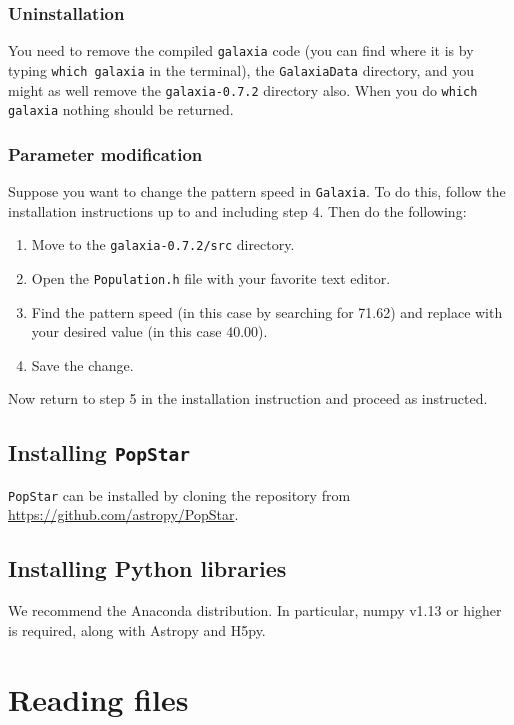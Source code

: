 \documentclass{scrartcl}
\begin{document}
\subsubsection{Uninstallation}

You need to remove the compiled \texttt{galaxia} code (you can find where it is by typing \texttt{which galaxia} in the terminal), the \texttt{GalaxiaData} directory, and you might as well remove the \texttt{galaxia-0.7.2} directory also.
When you do \texttt{which galaxia} nothing should be returned.

\subsubsection{Parameter modification}

Suppose you want to change the pattern speed in \texttt{Galaxia}.
To do this, follow the installation instructions up to and including step 4.
Then do the following:
\begin{enumerate}
    \item Move to the \texttt{galaxia-0.7.2/src} directory.
    \item Open the \texttt{Population.h} file with your favorite text editor.
    \item Find the pattern speed (in this case by searching for 71.62) and replace with your desired value (in this case 40.00).
    \item Save the change.
\end{enumerate}
Now return to step 5 in the installation instruction and proceed as instructed.

\subsection{Installing \texttt{PopStar}}

\texttt{PopStar} can be installed by cloning the repository from \url{https://github.com/astropy/PopStar}.

\subsection{Installing Python libraries}

We recommend the Anaconda distribution.
In particular, numpy v1.13 or higher is required, along with Astropy and H5py.

\newpage

\section{Reading files}
\end{document}
